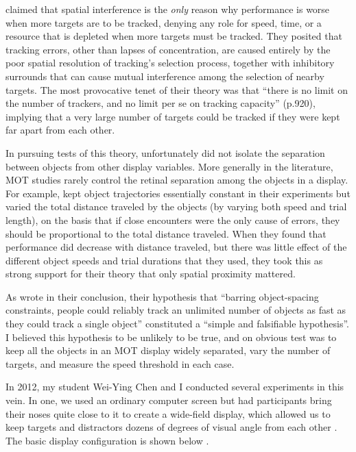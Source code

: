 \documentclass[
]{book}
\begin{document}
\citet{franconeriTrackingMultipleObjects2010a} claimed that spatial interference is the \emph{only} reason why performance is worse when more targets are to be tracked, denying any role for speed, time, or a resource that is depleted when more targets must be tracked. They posited that tracking errors, other than lapses of concentration, are caused entirely by the poor spatial resolution of tracking's selection process, together with inhibitory surrounds that can cause mutual interference among the selection of nearby targets. The most provocative tenet of their theory was that ``there is no limit on the number of trackers, and no limit per se on tracking capacity'' (p.920), implying that a very large number of targets could be tracked if they were kept far apart from each other.

In pursuing tests of this theory, \citet{franconeriTrackingMultipleObjects2010a} unfortunately did not isolate the separation between objects from other display variables. More generally in the literature, MOT studies rarely control the retinal separation among the objects in a display. For example, \citet{franconeriTrackingMultipleObjects2010a} kept object trajectories essentially constant in their experiments but varied the total distance traveled by the objects (by varying both speed and trial length), on the basis that if close encounters were the only cause of errors, they should be proportional to the total distance traveled. When they found that performance did decrease with distance traveled, but there was little effect of the different object speeds and trial durations that they used, they took this as strong support for their theory that only spatial proximity mattered.

As \citet{franconeriTrackingMultipleObjects2010a} wrote in their conclusion, their hypothesis that ``barring object-spacing constraints, people could reliably track an unlimited number of objects as fast as they could track a single object'' constituted a ``simple and falsifiable hypothesis''. I believed this hypothesis to be unlikely to be true, and on obvious test was to keep all the objects in an MOT display widely separated, vary the number of targets, and measure the speed threshold in each case.

In 2012, my student Wei-Ying Chen and I conducted several experiments in this vein. In one, we used an ordinary computer screen but had participants bring their noses quite close to it to create a wide-field display, which allowed us to keep targets and distractors dozens of degrees of visual angle from each other \citet{holcombeExhaustingAttentionalTracking2012}. The basic display configuration is shown below .
\end{document}
